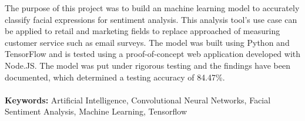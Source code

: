

The purpose of this project was to build an machine learning model to accurately classify facial expressions for sentiment analysis. This analysis tool's use case can be applied to retail and marketing fields to replace approached of measuring customer service such as email surveys. The model was built using Python and TensorFlow and is tested using a proof-of-concept web application developed with Node.JS. The model was put under rigorous testing and the findings have been documented, which determined a testing accuracy of 84.47\%. \\ \\
\textbf{Keywords:} Artificial Intelligence, Convolutional Neural Networks, Facial Sentiment Analysis, Machine Learning, Tensorflow
